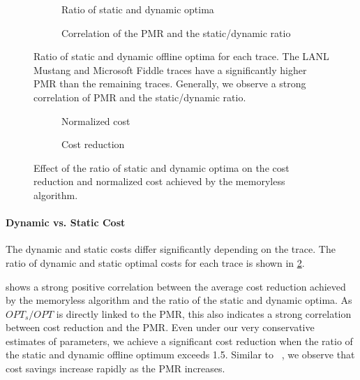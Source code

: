 \begin{figure}
    \begin{subfigure}[b]{.5\linewidth}
    \resizebox{\textwidth}{!}{}
    \caption{Ratio of static and dynamic optima}
    \end{subfigure}
    \begin{subfigure}[b]{.5\linewidth}
    \resizebox{\textwidth}{!}{}
    \caption{Correlation of the PMR and the static/dynamic ratio}\label{fig:case_studies:ud:opt_vs_opts:pmr}
    \end{subfigure}
    \caption{Ratio of static and dynamic offline optima for each trace. The LANL Mustang and Microsoft Fiddle traces have a significantly higher PMR than the remaining traces. Generally, we observe a strong correlation of PMR and the static/dynamic ratio.}\label{fig:case_studies:ud:opt_vs_opts}
\end{figure}

\begin{figure}
    \begin{subfigure}[b]{.49\linewidth}
    \resizebox{\textwidth}{!}{}
    \caption{Normalized cost}\label{fig:case_studies:ud:opt_vs_opts_against_normalized_cost}
    \end{subfigure}
    \begin{subfigure}[b]{.51\linewidth}
    \resizebox{\textwidth}{!}{}
    \caption{Cost reduction}\label{fig:case_studies:ud:opt_vs_opts_against_mean_cost_reduction}
    \end{subfigure}
    \caption{Effect of the ratio of static and dynamic optima on the cost reduction and normalized cost achieved by the memoryless algorithm.}
\end{figure}

\paragraph{Dynamic vs. Static Cost} The dynamic and static costs differ significantly depending on the trace. The ratio of dynamic and static optimal costs for each trace is shown in \cref{fig:case_studies:ud:opt_vs_opts}.

 shows a strong positive correlation between the average cost reduction achieved by the memoryless algorithm and the ratio of the static and dynamic optima. As $OPT_s / OPT$ is directly linked to the PMR, this also indicates a strong correlation between cost reduction and the PMR. Even under our very conservative estimates of parameters, we achieve a significant cost reduction when the ratio of the static and dynamic offline optimum exceeds 1.5. Similar to \citeauthor{Lin2011}~\cite{Lin2011}, we observe that cost savings increase rapidly as the PMR increases.

